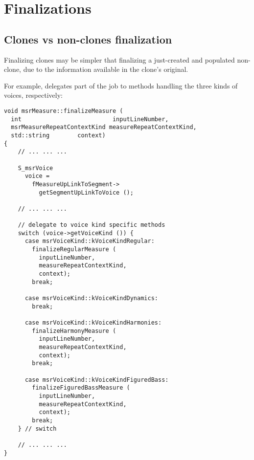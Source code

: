 
\chapter{Finalizations}

\section{Clones vs non-clones finalization}

Finalizing clones may be simpler that finalizing a just-created and populated non-clone, due to the information available in the clone's original.

For example,  delegates part of the job to methods handling the three kinds of voices, respectively:
\begin{lstlisting}[language=CPlusPlus]
void msrMeasure::finalizeMeasure (
  int                          inputLineNumber,
  msrMeasureRepeatContextKind measureRepeatContextKind,
  std::string        context)
{
	// ... ... ...

    S_msrVoice
      voice =
        fMeasureUpLinkToSegment->
          getSegmentUpLinkToVoice ();

	// ... ... ...

    // delegate to voice kind specific methods
    switch (voice->getVoiceKind ()) {
      case msrVoiceKind::kVoiceKindRegular:
        finalizeRegularMeasure (
          inputLineNumber,
          measureRepeatContextKind,
          context);
        break;

      case msrVoiceKind::kVoiceKindDynamics:
        break;

      case msrVoiceKind::kVoiceKindHarmonies:
        finalizeHarmonyMeasure (
          inputLineNumber,
          measureRepeatContextKind,
          context);
        break;

      case msrVoiceKind::kVoiceKindFiguredBass:
        finalizeFiguredBassMeasure (
          inputLineNumber,
          measureRepeatContextKind,
          context);
        break;
    } // switch

	// ... ... ...
}
\end{lstlisting}

